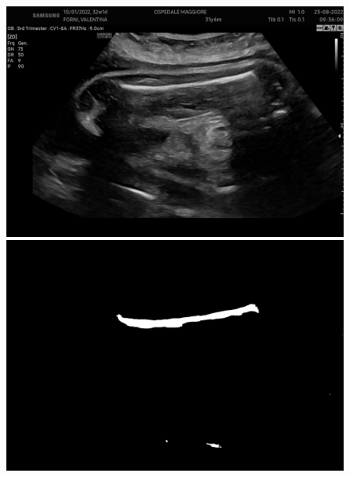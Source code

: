 \begin{figure}[!ht]
\begin{minipage}{0.32\textwidth}
	\end{minipage}
\end{figure}

\begin{figure}[!ht]
	\centering
	\begin{minipage}{0.32\textwidth}
		\centering
		\includegraphics[width=\textwidth]{./Immagini/nuovo_ecografo_results/4_image.png}
	\end{minipage}
	\hfill %
	\begin{minipage}{0.32\textwidth}
		\centering
		\includegraphics[width=\textwidth]{./Immagini/nuovo_ecografo_results/4_mask.png}
	\end{minipage}
	\hfill %
	\begin{minipage}{0.32\textwidth}
		\centering

\end{minipage}
\end{figure}
